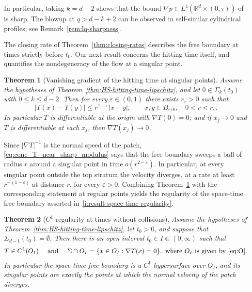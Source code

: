 \documentclass[11pt]{amsart}
\numberwithin{equation}{section}
\numberwithin{figure}{section}
\theoremstyle{plain}
\newtheorem{thm}{Theorem}[section]
\theoremstyle{definition}
\theoremstyle{remark}
\theoremstyle{plain}
\newcommand{\abs}[1]{\lvert #1 \rvert}
\newcommand{\vep}{\varepsilon}
\def\R{\mathbb{R}}
\begin{document}
In particular, taking $k=d-2$ shows that the bound $\nabla p\in L^4(\R^d\times (0,\tau))$ of \cite{DavidPerthame} is sharp. The blowup at $q>d-k+2$ can be observed in self-similar cylindrical profiles; see Remark~\ref{rem:lq-sharpness}.


The closing rate of Theorem~\ref{thm:closing-rates} describes the free boundary at times
strictly before $t_0$. Our next result concerns the hitting time itself, and quantifies
the nondegeneracy of the flow at a singular point.

\begin{thm}[Vanishing gradient of the hitting time at singular points]\label{prop:cone_T_differentiability}
Assume the hypotheses of Theorem~\ref{thm:HS-hitting-time-lipschitz}, and let $0\in\Sigma_k(t_0)$ with
$0\leq k\leq d-2$. Then for every $\vep\in(0,1)$ there exists $r_\vep>0$ such that
\begin{equation}\label{eq:cone_T_near_sharp_modulus}
    \abs{T(x)-T(y)}\leq r^{1-\vep}\abs{x-y},
    \qquad x,y\in B_{r/8},\quad 0<r<r_\vep .
\end{equation}
In particular $T$ is differentiable at the origin with $\nabla T(0)=0$; and if $x_j\to0$ and
$T$ is differentiable at each $x_j$, then $\nabla T(x_j)\to0$.
\end{thm}

Since $\abs{\nabla T}^{-1}$ is the normal speed of the patch, \eqref{eq:cone_T_near_sharp_modulus}
says that the free boundary sweeps a ball of radius $r$ around a singular point in time
$o(r^{2-\vep})$. In particular, at every singular point outside the top stratum the velocity
diverges, at a rate at least $r^{-(1-\vep)}$ at distance $r$, for every $\vep>0$. 
Combining Theorem~\ref{prop:cone_T_differentiability} with the corresponding statement at regular points
yields the regularity of the space-time free boundary asserted in~\ref{i:result-space-time-regularity}.

\begin{thm}[$C^1$ regularity at times without collisions]\label{thm:no_top_stratum_C1}
Assume the hypotheses of Theorem~\ref{thm:HS-hitting-time-lipschitz}, let $t_0>0$, and suppose that
$\Sigma_{d-1}(t_0)=\emptyset$. Then there is an open interval $t_0\in I\Subset(0,\infty)$ such that 
\[
    T\in C^1(O_I)\quad \hbox{ and }\quad
    \Sigma\cap O_I=\{x\in O_I:\nabla T(x)=0\} ,{\hbox{ where } O_I \hbox{ is given by } \eqref{eq:O}.}
\]
In particular the space-time free boundary is a $C^1$ hypersurface over $O_I$, and its
singular points are exactly the points at which the normal velocity of the patch diverges.
\end{thm}
\end{document}

